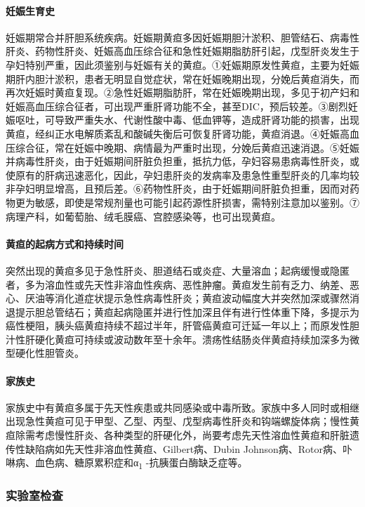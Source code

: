 \paragraph{妊娠生育史}

妊娠期常合并肝胆系统疾病。妊娠期黄疸多因妊娠期胆汁淤积、胆管结石、病毒性肝炎、药物性肝炎、妊娠高血压综合征和急性妊娠期脂肪肝引起，戊型肝炎发生于孕妇特别严重，因此须鉴别与妊娠有关的黄疸。①妊娠期原发性黄疸，主要为妊娠期肝内胆汁淤积，患者无明显自觉症状，常在妊娠晚期出现，分娩后黄疸消失，而再次妊娠时黄疸复现。②急性妊娠期脂肪肝，常在妊娠晚期出现，多见于初产妇和妊娠高血压综合征者，可出现严重肝肾功能不全，甚至DIC，预后较差。③剧烈妊娠呕吐，可导致严重失水、代谢性酸中毒、低血钾等，造成肝肾功能的损害，出现黄疸，经纠正水电解质紊乱和酸碱失衡后可恢复肝肾功能，黄疸消退。④妊娠高血压综合征，常在妊娠中晚期、病情最为严重时出现，分娩后黄疸迅速消退。⑤妊娠并病毒性肝炎，由于妊娠期间肝脏负担重，抵抗力低，孕妇容易患病毒性肝炎，或使原有的肝病迅速恶化，因此，孕妇患肝炎的发病率及患急性重型肝炎的几率均较非孕妇明显增高，且预后差。⑥药物性肝炎，由于妊娠期间肝脏负担重，因而对药物更为敏感，即使是常规剂量也可能引起药源性肝损害，需特别注意加以鉴别。⑦病理产科，如葡萄胎、绒毛膜癌、宫腔感染等，也可出现黄疸。

\paragraph{黄疸的起病方式和持续时间}

突然出现的黄疸多见于急性肝炎、胆道结石或炎症、大量溶血；起病缓慢或隐匿者，多为溶血性或先天性非溶血性疾病、恶性肿瘤。黄疸发生前有乏力、纳差、恶心、厌油等消化道症状提示急性病毒性肝炎；黄疸波动幅度大并突然加深或骤然消退提示胆总管结石；黄疸起病隐匿并进行性加深且伴有进行性体重下降，多提示为癌性梗阻，胰头癌黄疸持续不超过半年，肝管癌黄疸可迁延一年以上；而原发性胆汁性肝硬化黄疸可持续或波动数年至十余年。溃疡性结肠炎伴黄疸持续加深多为微型硬化性胆管炎。

\paragraph{家族史}

家族史中有黄疸多属于先天性疾患或共同感染或中毒所致。家族中多人同时或相继出现急性黄疸可见于甲型、乙型、丙型、戊型病毒性肝炎和钩端螺旋体病；慢性黄疸除需考虑慢性肝炎、各种类型的肝硬化外，尚要考虑先天性溶血性黄疸和肝脏遗传性缺陷病如先天性非溶血性黄疸、Gilbert病、Dubin
Johnson病、Rotor病、卟啉病、血色病、糖原累积症和α\textsubscript{1}
-抗胰蛋白酶缺乏症等。

\subsubsection{实验室检查}


